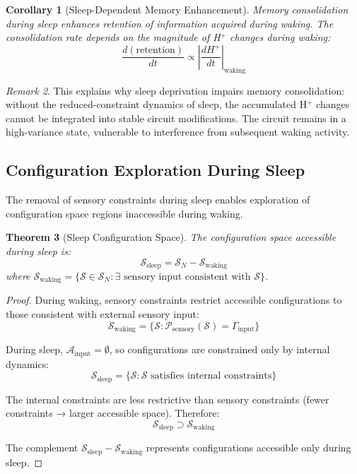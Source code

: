 \documentclass[aps,prd,twocolumn,superscriptaddress,floatfix,nofootinbib]{revtex4-2}
\newtheorem{theorem}{Theorem}[section]
\newtheorem{corollary}[theorem]{Corollary}
\theoremstyle{remark}
\newtheorem{remark}[theorem]{Remark}
\begin{document}
\begin{corollary}[Sleep-Dependent Memory Enhancement]
\label{cor:sleep_memory}
Memory consolidation during sleep enhances retention of information acquired during waking. The consolidation rate depends on the magnitude of H$^+$ changes during waking:
\begin{equation}
\frac{d(\text{retention})}{dt} \propto \left|\frac{dH^+}{dt}\right|_{\text{waking}}
\end{equation}
\end{corollary}

\begin{remark}
This explains why sleep deprivation impairs memory consolidation: without the reduced-constraint dynamics of sleep, the accumulated H$^+$ changes cannot be integrated into stable circuit modifications. The circuit remains in a high-variance state, vulnerable to interference from subsequent waking activity.
\end{remark}

\subsection{Configuration Exploration During Sleep}

The removal of sensory constraints during sleep enables exploration of configuration space regions inaccessible during waking.

\begin{theorem}[Sleep Configuration Space]
\label{thm:sleep_config_space}
The configuration space accessible during sleep is:
\begin{equation}
\mathcal{S}_{\text{sleep}} = \mathcal{S}_N - \mathcal{S}_{\text{waking}}
\end{equation}
where $\mathcal{S}_{\text{waking}} = \{\mathcal{S} \in \mathcal{S}_N : \exists \text{ sensory input consistent with } \mathcal{S}\}$.
\end{theorem}

\begin{proof}
During waking, sensory constraints restrict accessible configurations to those consistent with external sensory input:
$$
\mathcal{S}_{\text{waking}} = \{\mathcal{S} : \mathcal{P}_{\text{sensory}}(\mathcal{S}) = \Gamma_{\text{input}}\}
$$

During sleep, $\mathcal{A}_{\text{input}} = \emptyset$, so configurations are constrained only by internal dynamics:
$$
\mathcal{S}_{\text{sleep}} = \{\mathcal{S} : \mathcal{S} \text{ satisfies internal constraints}\}
$$

The internal constraints are less restrictive than sensory constraints (fewer constraints → larger accessible space). Therefore:
$$
\mathcal{S}_{\text{sleep}} \supset \mathcal{S}_{\text{waking}}
$$

The complement $\mathcal{S}_{\text{sleep}} - \mathcal{S}_{\text{waking}}$ represents configurations accessible only during sleep.
\end{proof}
\end{document}
